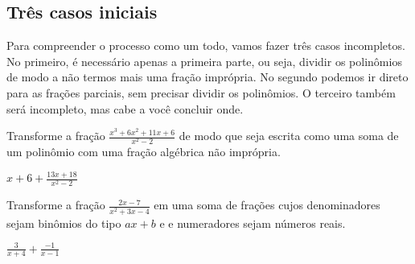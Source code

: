 \documentclass[main_estudante.tex]{subfiles}
\begin{document}
\subsection*{Três casos iniciais}


Para compreender o processo como um todo, vamos fazer três casos incompletos. No primeiro, é necessário apenas a primeira parte, ou seja, dividir os polinômios de modo a não termos mais uma fração imprópria. No segundo podemos ir direto para as frações parciais, sem precisar dividir os polinômios. O terceiro também será incompleto, mas cabe a você concluir onde.


\begin{questao}
Transforme a fração $\frac{x^3+6x^2+11x+6}{x^2-2}$ de modo que seja escrita como uma soma de um polinômio com uma fração algébrica não imprópria.
\end{questao}

\begin{gabarito}
	\begin{gabaritoQuestao}
		$x+6 + \frac{13x+18}{x^2-2}$
	\end{gabaritoQuestao}
\end{gabarito}


\begin{questao}
Transforme a fração $\frac{2x-7}{x^2+3x-4}$ em uma soma de frações cujos denominadores sejam binômios do tipo $ax+b$ e e numeradores sejam números reais.
\end{questao}

\begin{gabarito}
	\begin{gabaritoQuestao}
		$\frac{3}{x+4}+\frac{-1}{x-1}$
	\end{gabaritoQuestao}
\end{gabarito}
\end{document}
